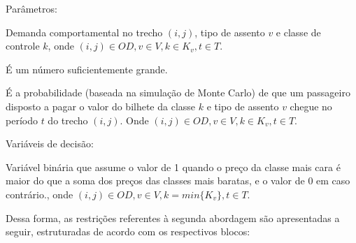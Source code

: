 Parâmetros:
\begin{description}[style=unboxed, leftmargin=2.5cm, labelindent=1.5cm]
	\setlength{\itemsep}{-2.2em} %
	\setlength{\parskip}{0em} %
	\item[$d'_{ijvkt}:$] Demanda comportamental no trecho $(i,j)$, tipo de assento $v$ e classe de controle $k$, onde $(i,j) \in OD,v \in V, k \in K_v, t \in T$.\\
	\item[$M:$] É um número suficientemente grande.\\
	\item[$\sigma_{ijvkt}:$] É a probabilidade (baseada na simulação de Monte Carlo) de que um passageiro disposto a pagar o valor do bilhete da classe $k$ e tipo de assento $v$ chegue no período $t$ do trecho $(i,j)$. Onde $(i,j) \in OD,v \in V, k \in K_v, t \in T$.
\end{description}

Variáveis de decisão:
\begin{description}[style=unboxed, leftmargin=2.5cm, labelindent=1.5cm]
	\setlength{\itemsep}{-2.2em} %
	\setlength{\parskip}{0em} %
	\item[$\delta_{ijvkt}:$] Variável binária que assume o valor de 1 quando o preço da classe mais cara é maior do que a soma dos preços das classes mais baratas, e o valor de 0 em caso contrário., onde $(i,j) \in OD, v \in V, k=min\{K_v\}, t \in T$.
\end{description}


Dessa forma, as restrições referentes à segunda abordagem são apresentadas a seguir, estruturadas de acordo com os respectivos blocos:


